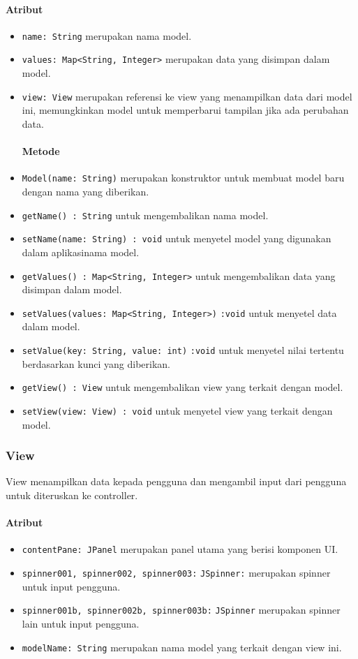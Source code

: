 \documentclass[conference]{IEEEtran}
\begin{document}
\paragraph{Atribut} 
\begin{itemize}
\item \verb |name: String| merupakan nama model. 
\item \verb |values: Map<String, Integer>| merupakan data yang disimpan dalam model. 
\item \verb |view: View| merupakan referensi ke view yang menampilkan data dari model ini, memungkinkan model untuk memperbarui tampilan jika ada perubahan data. 
\paragraph{Metode} 
\item \verb |Model(name: String)| merupakan konstruktor untuk membuat model baru dengan nama yang diberikan.
\item \verb |getName() : String| untuk mengembalikan nama model. 
\item \verb |setName(name: String) : void| untuk menyetel model yang digunakan dalam aplikasinama model.
\item \verb |getValues() : Map<String, Integer>| untuk mengembalikan data yang disimpan dalam model. 
\item \verb |setValues(values: Map<String, Integer>)| \verb |:void| untuk menyetel data dalam model.
\item \verb |setValue(key: String, value: int)| \verb |:void| untuk menyetel nilai tertentu berdasarkan kunci yang diberikan.
\item \verb |getView() : View| untuk mengembalikan view yang terkait dengan model.
\item \verb |setView(view: View) : void| untuk menyetel view yang terkait dengan model.
\end{itemize}

\subsubsection{View}
View menampilkan data kepada pengguna dan mengambil input dari pengguna untuk diteruskan ke controller. 
\paragraph{Atribut} 
\begin{itemize}
\item \verb |contentPane: JPanel| merupakan panel utama yang berisi komponen UI.
\item \verb |spinner001, spinner002, spinner003:| \verb |JSpinner:| merupakan spinner untuk input pengguna.
\item \verb |spinner001b, spinner002b, spinner003b:| \verb |JSpinner| merupakan spinner lain untuk input pengguna.
\item \verb |modelName: String| merupakan nama model yang terkait dengan view ini. 
\end{itemize}
\end{document}
